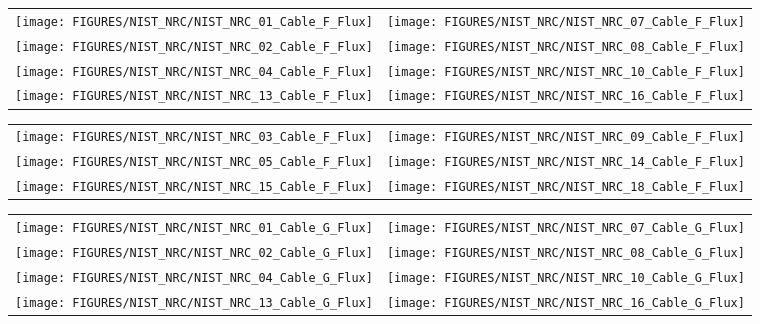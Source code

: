 \begin{figure}[p]
\begin{tabular*}{\textwidth}{l@{\extracolsep{\fill}}r}
\texttt{[image: FIGURES/NIST\_NRC/NIST\_NRC\_01\_Cable\_F\_Flux]} &
\texttt{[image: FIGURES/NIST\_NRC/NIST\_NRC\_07\_Cable\_F\_Flux]} \\
\texttt{[image: FIGURES/NIST\_NRC/NIST\_NRC\_02\_Cable\_F\_Flux]} &
\texttt{[image: FIGURES/NIST\_NRC/NIST\_NRC\_08\_Cable\_F\_Flux]} \\
\texttt{[image: FIGURES/NIST\_NRC/NIST\_NRC\_04\_Cable\_F\_Flux]} &
\texttt{[image: FIGURES/NIST\_NRC/NIST\_NRC\_10\_Cable\_F\_Flux]} \\
\texttt{[image: FIGURES/NIST\_NRC/NIST\_NRC\_13\_Cable\_F\_Flux]} &
\texttt{[image: FIGURES/NIST\_NRC/NIST\_NRC\_16\_Cable\_F\_Flux]}
\end{tabular*}
\label{NIST_NRC_Cable_F_Flux_Closed}
\end{figure}

\begin{figure}[p]
\begin{tabular*}{\textwidth}{l@{\extracolsep{\fill}}r}
\texttt{[image: FIGURES/NIST\_NRC/NIST\_NRC\_03\_Cable\_F\_Flux]} &
\texttt{[image: FIGURES/NIST\_NRC/NIST\_NRC\_09\_Cable\_F\_Flux]} \\
\texttt{[image: FIGURES/NIST\_NRC/NIST\_NRC\_05\_Cable\_F\_Flux]} &
\texttt{[image: FIGURES/NIST\_NRC/NIST\_NRC\_14\_Cable\_F\_Flux]} \\
\texttt{[image: FIGURES/NIST\_NRC/NIST\_NRC\_15\_Cable\_F\_Flux]} &
\texttt{[image: FIGURES/NIST\_NRC/NIST\_NRC\_18\_Cable\_F\_Flux]}
\end{tabular*}
\label{NIST_NRC_Cable_F_Flux_Open}
\end{figure}

\begin{figure}[p]
\begin{tabular*}{\textwidth}{l@{\extracolsep{\fill}}r}
\texttt{[image: FIGURES/NIST\_NRC/NIST\_NRC\_01\_Cable\_G\_Flux]} &
\texttt{[image: FIGURES/NIST\_NRC/NIST\_NRC\_07\_Cable\_G\_Flux]} \\
\texttt{[image: FIGURES/NIST\_NRC/NIST\_NRC\_02\_Cable\_G\_Flux]} &
\texttt{[image: FIGURES/NIST\_NRC/NIST\_NRC\_08\_Cable\_G\_Flux]} \\
\texttt{[image: FIGURES/NIST\_NRC/NIST\_NRC\_04\_Cable\_G\_Flux]} &
\texttt{[image: FIGURES/NIST\_NRC/NIST\_NRC\_10\_Cable\_G\_Flux]} \\
\texttt{[image: FIGURES/NIST\_NRC/NIST\_NRC\_13\_Cable\_G\_Flux]} &
\texttt{[image: FIGURES/NIST\_NRC/NIST\_NRC\_16\_Cable\_G\_Flux]}
\end{tabular*}
\label{NIST_NRC_Cable_G_Flux_Closed}
\end{figure}

